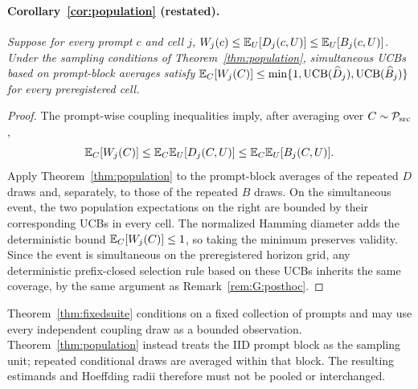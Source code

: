 \paragraph{Corollary~\ref{cor:population} (restated).}
\emph{Suppose for every prompt $c$ and cell $j$,
$W_j(c)\le\mathbb{E}_U[D_j(c,U)]\le\mathbb{E}_U[B_j(c,U)]$. Under the sampling conditions of
Theorem~\ref{thm:population}, simultaneous UCBs based on prompt-block averages satisfy
$\mathbb{E}_C[W_j(C)]\le\min\{1,\operatorname{UCB}(\widehat D_j),
\operatorname{UCB}(\widehat B_j)\}$ for every preregistered cell.}

\begin{proof}
The prompt-wise coupling inequalities imply, after averaging over $C\sim\mathcal{P}_{\mathrm{src}}$,
\[
\mathbb{E}_C[W_j(C)]
\le \mathbb{E}_C\mathbb{E}_U[D_j(C,U)]
\le \mathbb{E}_C\mathbb{E}_U[B_j(C,U)].
\]
Apply Theorem~\ref{thm:population} to the prompt-block averages of the repeated $D$ draws and,
separately, to those of the repeated $B$ draws. On the simultaneous event, the two population
expectations on the right are bounded by their corresponding UCBs in every cell. The normalized
Hamming diameter adds the deterministic bound $\mathbb{E}_C[W_j(C)]\le1$, so taking the minimum preserves
validity. Since the event is simultaneous on the preregistered horizon grid, any deterministic
prefix-closed selection rule based on these UCBs inherits the same coverage, by the same argument as
Remark~\ref{rem:G:posthoc}.
\end{proof}

\begin{remark}
Theorem~\ref{thm:fixedsuite} conditions on a fixed collection of prompts and may use every
independent coupling draw as a bounded observation. Theorem~\ref{thm:population} instead treats the
IID prompt block as the sampling unit; repeated conditional draws are averaged within that block.
The resulting estimands and Hoeffding radii therefore must not be pooled or interchanged.
\end{remark}
